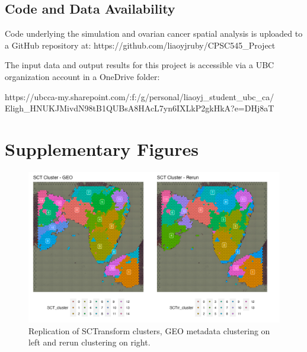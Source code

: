 \documentclass{article}
\begin{document}
\subsection*{Code and Data Availability}

Code underlying the simulation and ovarian cancer spatial analysis is uploaded to a GitHub repository at: https://github.com/liaoyjruby/CPSC545\_Project

The input data and output results for this project is accessible via a UBC organization account in a OneDrive folder: 

https://ubcca-my.sharepoint.com/:f:/g/personal/liaoyj\_student\_ubc\_ca/ \\ Eligh\_HNUKJMivdN98tB1QUBsA8HAcL7yn6IXLkP2gkHkA?e=DHj8aT

\newpage



\newpage

\section*{Supplementary Figures}

\begin{figure}[h!]
    \centering
    \includegraphics[width=\textwidth]{images/SpatialDimPlot_D_GTFB1170_SmallCellOvarianCancer_SCTrrcl.png}
    \caption{Replication of \citet{sanders_small_2022} SCTransform clusters, GEO metadata clustering on left and rerun clustering on right.}
    \label{fig:SCTcl_rr}
\end{figure}
\end{document}
